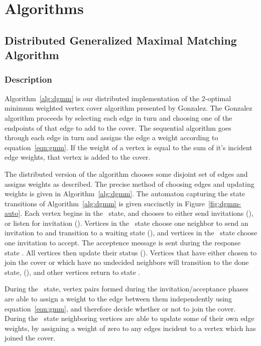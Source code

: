 \section{Algorithms}
\label{sec:algorithms}

\subsection{Distributed Generalized Maximal Matching Algorithm}
\subsubsection{Description}
Algorithm~\ref{alg:dgmm} is our distributed implementation of the 2-optimal minimum weighted vertex cover algorithm presented by Gonzalez.\cite{Gonzalez1995129} The Gonzalez algorithm proceeds by selecting each edge in turn and choosing one of the endpoints of that edge to add to the cover. The sequential algorithm goes through each edge in turn and assigns the edge a weight according to equation~\ref{eqn:gmm}. If the weight of a vertex is equal to the sum of it's incident edge weights, that vertex is added to the cover. 



The distributed version of the algorithm chooses some disjoint set of edges and assigns weights as described. The precise method of choosing edges and updating weights is given in Algorithm~\ref{alg:dgmm}. The automaton capturing the state transitions of Algorithm~\ref{alg:dgmm} is given succinctly in Figure~\ref{fig:dgmm-auto}. Each vertex begins in the \cCd\ state, and chooses to either send invitations (\cId), or listen for invitation (\cLd). Vertices in the \cId\ state choose one neighbor to send an invitation to and transition to a waiting state (\cWd), and vertices in the \cLd\ state choose one invitation to accept. The acceptence message is sent during the response state \cRd. All vertices then update their status (\cUd). Vertices that have either chosen to join the cover or which have no undecided neighbors will transition to the done state, (\cDd), and other vertices return to state \cCd.  



During the \cUd\ state, vertex pairs formed during the invitation/acceptance phases are able to assign a weight to the edge between them independently using equation~\ref{eqn:gmm}, and therefore decide whether or not to join the cover. During the \cEd\ state neighboring vertices are able to update some of their own edge weights, by assigning a weight of zero to any edges incident to a vertex which has joined the cover.

